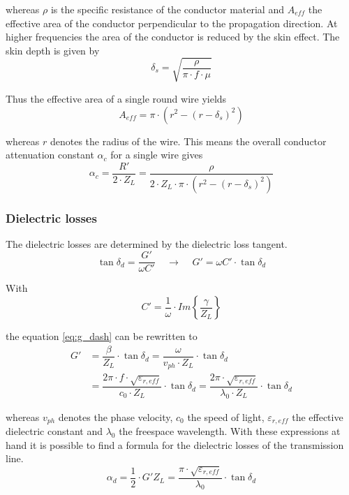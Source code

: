 whereas $\rho$ is the specific resistance of the conductor material
and $A_{eff}$ the effective area of the conductor perpendicular to the
propagation direction.  At higher frequencies the area of the
conductor is reduced by the skin effect.  The skin depth is given by
\begin{equation}
\delta_s = \sqrt{\dfrac{\rho}{\pi\cdot f\cdot\mu}}
\end{equation}

Thus the effective area of a single round wire yields
\begin{equation}
A_{eff} = \pi\cdot\left(r^2 - (r-\delta_s)^2\right)
\end{equation}

whereas $r$ denotes the radius of the wire.  This means the overall
conductor attenuation constant $\alpha_c$ for a single wire gives
\begin{equation}
\alpha_c = \dfrac{R'}{2\cdot Z_L} = \dfrac{\rho}{2\cdot Z_L\cdot\pi\cdot\left(r^2 - (r-\delta_s)^2\right)}
\end{equation}

\subsubsection{Dielectric losses}

The dielectric losses are determined by the dielectric loss tangent.
\begin{equation}
\label{eq:g_dash}
\tan{ \delta_d } = \dfrac{G'}{\omega C'}
\;\;\;\; \rightarrow \;\;\;\;
G' = \omega C' \cdot \tan{ \delta_d }
\end{equation}

With
\begin{equation}
C' = \dfrac{1}{\omega}\cdot Im \left\{\dfrac{\gamma}{Z_L}\right\}
\end{equation}

the equation \eqref{eq:g_dash} can be rewritten to
\begin{equation}
\begin{split}
G' &= \dfrac{\beta}{Z_L}\cdot \tan{ \delta_d } = \dfrac{\omega}{v_{ph}\cdot Z_L}\cdot \tan{ \delta_d } \\
&= \dfrac{2\pi\cdot f\cdot \sqrt{\varepsilon_{r,eff}}}{c_0\cdot Z_L}\cdot \tan{ \delta_d } = \dfrac{2\pi\cdot \sqrt{\varepsilon_{r,eff}}}{\lambda_0\cdot Z_L}\cdot \tan{ \delta_d }
\end{split}
\end{equation}

whereas $v_{ph}$ denotes the phase velocity, $c_0$ the speed of light,
$\varepsilon_{r,eff}$ the effective dielectric constant and
$\lambda_0$ the freespace wavelength.  With these expressions at hand
it is possible to find a formula for the dielectric losses of the
transmission line.
\begin{equation}
\alpha_d = \dfrac{1}{2}\cdot G'Z_L = \dfrac{\pi\cdot \sqrt{\varepsilon_{r,eff}}}{\lambda_0}\cdot \tan{ \delta_d }
\end{equation}

